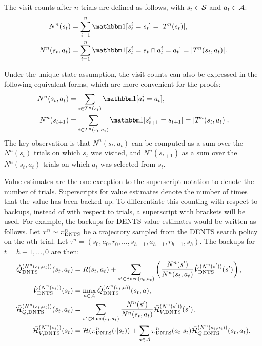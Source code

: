     The visit counts after $n$ trials are defined as follows, with $s_t\in\mathcal{S}$ and $a_t\in\mathcal{A}$:
    \begin{align}
        N^n(s_t) &= \sum_{i=1}^n \one[s^i_t = s_t] = |T^n(s_t)|, \\
        N^n(s_t,a_t) &= \sum_{i=1}^n \one[s^i_t = s_t \cap a^i_t = a_t] = |T^n(s_t,a_t)|.
    \end{align}

    Under the unique state assumption, the visit counts can also be expressed in the following equivalent forms, which are more convenient for the proofs:
    \begin{align}
    N^n(s_t,a_t) &= \sum_{i\in T^n(s_t)} \one[a^i_t = a_t], 
        \label{eq:4:nsa_sum} \\
    N^n(s_{t+1}) &= \sum_{i\in T^n(s_t,a_t)} 
        \one[s^i_{t+1} = s_{t+1}] = |T^n(s_t,a_t)|. 
        \label{eq:4:ns_sum}
    \end{align}
    The key observation is that $N^n(s_t,a_t)$ can be computed as a sum over the $N^n(s_t)$ trials on which $s_t$ was visited, and $N^n(s_{t+1})$ as a sum over the $N^n(s_t,a_t)$ trials on which $a_t$ was selected from $s_t$.

    Value estimates are the one exception to the superscript notation to denote the number of trials. Superscripts for value estimates denote the number of times that the value has been backed up. To differentiate this counting with respect to backups, instead of with respect to trials, a superscript with brackets will be used. For example, the backups for DENTS value estimates would be written as follows. Let $\tau^n \sim {\pi^{n}_{{\textnormal{DNTS}}}}$ be a trajectory sampled from the DENTS search policy on the $n$th trial. Let $\tau^n=(s_0,a_0,r_0,\ldots,s_{h-1},a_{h-1},r_{h-1},s_{h})$. The backups for $t=h-1,\ldots,0$ are then: 
    \begin{align}
        {\hat{Q}^{(N^n(s_t,a_t))}_{{\textnormal{DNTS}}}}(s_t,a_t) &= 
            R(s_t,a_t) + \sum_{s' \in {\textnormal{Succ}(s_t,a_t)}} \left( 
                \frac{N^n(s')}{N^n(s_t,a_t)} {\hat{V}^{(N^n(s'))}_{{\textnormal{DNTS}}}}(s') \right), 
            \label{eq:dp_q_backup} \\ 
        {\hat{V}^{(N^n(s_t))}_{{\textnormal{DNTS}}}}(s_t) &=\max_{a\in\mathcal{A}} {\hat{Q}^{(N^n(s_t,a))}_{{\textnormal{DNTS}}}}(s_t,a), 
            \label{eq:dp_v_backup} \\
        {\bar{\mathcal{H}}^{(N^n(s_t,a_t))}_{Q,{\textnormal{DNTS}}}}(s_t,a_t) &= 
            \sum_{s'\in {\textnormal{Succ}(s_t,a_t)}} \frac{N^n(s')}{N^n(s_t,a_t)} {\bar{\mathcal{H}}^{(N^n(s'))}_{V,{\textnormal{DNTS}}}}(s'), \\
        {\bar{\mathcal{H}}^{(N^n(s_t))}_{V,{\textnormal{DNTS}}}}(s_t) &= 
            \mathcal{H}({\pi^{n}_{{\textnormal{DNTS}}}}(\cdot | s_t)) 
                + \sum_{a\in\mathcal{A}} {\pi^{n}_{{\textnormal{DNTS}}}}(a_t|s_t){\bar{\mathcal{H}}^{(N^n(s_t,a_t))}_{Q,{\textnormal{DNTS}}}}(s_t,a_t).
    \end{align}
    
